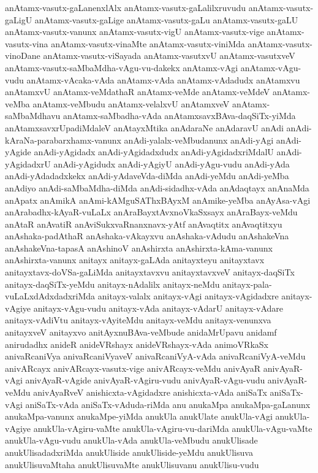 {anAtamx-vasutx-gaLanenxlAlx
anAtamx-vasutx-gaLalilxruvudu
anAtamx-vasutx-gaLigU
anAtamx-vasutx-gaLige
anAtamx-vasutx-gaLu
anAtamx-vasutx-gaLU
anAtamx-vasutx-vanunx
anAtamx-vasutx-vigU
anAtamx-vasutx-vige
anAtamx-vasutx-vina
anAtamx-vasutx-vinaMte
anAtamx-vasutx-viniMda
anAtamx-vasutx-vinoDane
anAtamx-vasutx-viSayada
anAtamx-vasutxvU
anAtamx-vasutxveV
anAtamx-vasutx-saMbaMdha-vAgu-vu-dakekx
anAtamx-vAgi
anAtamx-vAgu-vudu
anAtamx-vAcaka-vAda
anAtamx-vAda
anAtamx-vAdadudx
anAtamxvu
anAtamxvU
anAtamx-veMdathaR
anAtamx-veMde
anAtamx-veMdeV
anAtamx-veMba
anAtamx-veMbudu
anAtamx-velalxvU
anAtamxveV
anAtamx-saMbaMdhavu
anAtamx-saMbadha-vAda
anAtamxsavxBAva-daqSiTx-yiMda
anAtamxsavxrUpadiMdaleV
anAtayxMtika
anAdaraNe
anAdaravU
anAdi
anAdi-kAraNa-parabarxhamx-vanunx
anAdi-yalalx-veMbudanunx
anAdi-yAgi
anAdi-yAgide
anAdi-yAgidadx
anAdi-yAgidadxdudx
anAdi-yAgidadxriMdalU
anAdi-yAgidadxrU
anAdi-yAgidudx
anAdi-yAgiyU
anAdi-yAgu-vudu
anAdi-yAda
anAdi-yAdadadxkekx
anAdi-yAdaveVda-diMda
anAdi-yeMdu
anAdi-yeMba
anAdiyo
anAdi-saMbaMdha-diMda
anAdi-sidadhx-vAda
anAdaqtayx
anAnaMda
anApatx
anAmikA
anAmi-kAMguSAThxBAyxM
anAmike-yeMba
anAyAsa-vAgi
anArabadhx-kAyaR-vuLaLx
anAraBayxtAvxnoVkaSxsayx
anAraBayx-veMdu
anAtaR
anAvatiR
anAviSukxvaRnanxnavx-yAtf
anAvaqtitx
anAvaqtitxyu
anAshaka-padAthaR
anAshaka-vAkayxvu
anAshaka-vAdudu
anAshakeVna
anAshakeVna-tapasA
anAshinoV
anAshirxta
anAshirxta-kAma-vanunx
anAshirxta-vanunx
anitayx
anitayx-gaLAda
anitayxteyu
anitayxtavx
anitayxtavx-doVSa-gaLiMda
anitayxtavxvu
anitayxtavxveV
anitayx-daqSiTx
anitayx-daqSiTx-yeMdu
anitayx-nAdalilx
anitayx-neMdu
anitayx-pala-vuLaLxdAdxdadxriMda
anitayx-valalx
anitayx-vAgi
anitayx-vAgidadxre
anitayx-vAgiye
anitayx-vAgu-vudu
anitayx-vAda
anitayx-vAdarU
anitayx-vAdare
anitayx-vAdiVtu
anitayx-vAyiteMdu
anitayx-veMdu
anitayx-venunxva
anitayxveV
anitayxvo
anitAyxnuBAva-veMbude
anidaMrUpavu
anidamf
anirudadhx
anideR
anideVRshayx
anideVRshayx-vAda
animoVRkaSx
anivaRcaniVya
anivaRcaniVyaveV
anivaRcaniVyA-vAda
anivaRcaniVyA-veMdu
anivARcayx
anivARcayx-vasutx-vige
anivARcayx-veMdu
anivAyaR
anivAyaR-vAgi
anivAyaR-vAgide
anivAyaR-vAgiru-vudu
anivAyaR-vAgu-vudu
anivAyaR-veMdu
anivAyaRveV
anishicxta-vAgidadxre
anishicxta-vAda
aniSaTx
aniSaTx-vAgi
aniSaTx-vAda
aniSaTx-vAduda-riMda
anu
anukaMpa
anukaMpa-gaLanunx
anukaMpa-vanunx
anukaMpe-yiMda
anukUla
anukUlate
anukUla-vAgi
anukUla-vAgiye
anukUla-vAgiru-vaMte
anukUla-vAgiru-vu-dariMda
anukUla-vAgu-vaMte
anukUla-vAgu-vudu
anukUla-vAda
anukUla-veMbudu
anukUlisade
anukUlisadadxriMda
anukUliside
anukUliside-yeMdu
anukUlisuva
anukUlisuvaMtaha
anukUlisuvaMte
anukUlisuvanu
anukUlisu-vudu
}
